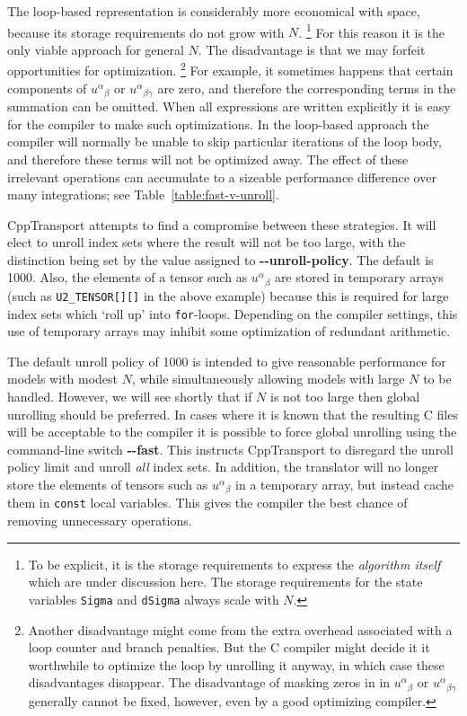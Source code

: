 \documentclass[11pt,a4paper]{article}
\newcommand{\packagefont}{\sffamily}
\newcommand{\CppTransport}{{\packagefont CppTransport}}
\newcommand{\option}[1]{{\ttfamily\bfseries\small #1}}
\newcommand\CC{C\nolinebreak\hspace{-.05em}\raisebox{.4ex}{\relsize{-3}{\textbf{+}}}\nolinebreak\hspace{-.10em}\raisebox{.4ex}{\relsize{-3}{\textbf{+}}}}
\begin{document}
\begin{itemize}
    The loop-based representation is considerably more economical with space,
    because its storage requirements do not grow with $N$.%
        \footnote{To be explicit, it is the storage requirements to
        express the \emph{algorithm itself} which are under discussion
        here. The storage requirements for the state variables
        \texttt{Sigma} and \texttt{dSigma}
        always scale with $N$.}
    For this reason
    it is the only viable approach for general $N$.
    The disadvantage is that we may forfeit opportunities
    for optimization.%
    	\footnote{Another disadvantage might come from
    	the extra overhead associated with a loop counter
    	and branch penalties. But the {\CC} compiler might
    	decide it it worthwhile to
    	optimize the loop by unrolling it anyway, in which
    	case these disadvantages disappear.
    	The disadvantage of masking zeros in
    	in ${u^\alpha}_\beta$ or ${u^\alpha}_{\beta\gamma}$
    	generally cannot be fixed, however, even by a good
    	optimizing compiler.}
    For example, it sometimes happens that
    certain components of ${u^\alpha}_\beta$
    or ${u^\alpha}_{\beta\gamma}$ are zero,
    and therefore the corresponding terms in the summation
    can be omitted.
    When all expressions are written explicitly
    it is easy for the compiler to make such
    optimizations.   
    In the loop-based approach
    the compiler will normally be unable to
    skip particular iterations of the loop body,
    and therefore these terms will not be optimized away.
    The effect of these irrelevant operations
    can accumulate to a sizeable performance
    difference over many integrations;
    see Table~\ref{table:fast-v-unroll}.
\end{itemize}

{\CppTransport} attempts to find a compromise between these
strategies.
It will elect to unroll index sets where the result will not
be too large,
with
the distinction being set by the value assigned to
\option{{-}{-}unroll-policy}. The default is 1000.
Also,
the elements of a tensor such as ${u^\alpha}_\beta$
are stored in temporary arrays (such as
\texttt{U2_TENSOR[][]} in the above example)
because this is required for
large index sets which `roll up' into
\texttt{for}-loops.
Depending on the compiler settings, this use
of temporary arrays may inhibit some
optimization of redundant arithmetic.

The default unroll policy of 1000 is intended to give reasonable
performance for models with modest $N$, while simultaneously
allowing models with large $N$ to be handled.
However, we will see shortly
that if $N$ is not too large then global unrolling should be preferred.
In cases where it is known that the resulting {\CC} files will be
acceptable to the compiler it is possible to force global
unrolling using the command-line switch
\option{{-}{-}fast}. This instructs
{\CppTransport} to disregard the unroll policy limit and unroll
\emph{all} index sets.
In addition, the translator will no longer store the elements of tensors such as
${u^\alpha}_\beta$ in a temporary array, but instead cache them
in \texttt{const} local variables.
This gives the compiler the best chance of removing unnecessary operations.
\end{document}
